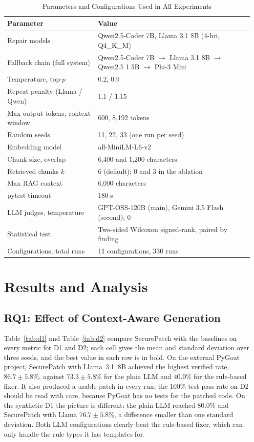 \documentclass[12pt,onecolumn,draftclsnofoot]{IEEEtran}
\begin{document}
\begin{table}[!tb]
\centering
\caption{Parameters and Configurations Used in All Experiments}
\label{tab:params}
\small
\renewcommand{\arraystretch}{1.15}
\begin{tabular}{L{5.6cm} L{9.0cm}}
\toprule
\textbf{Parameter} & \textbf{Value} \\
\midrule
Repair models & Qwen2.5-Coder 7B, Llama 3.1 8B (4-bit, Q4\_K\_M) \\
Fallback chain (full system) & Qwen2.5-Coder 7B $\rightarrow$ Llama 3.1 8B $\rightarrow$ Qwen2.5 1.5B $\rightarrow$ Phi-3 Mini \\
Temperature, top-$p$ & 0.2, 0.9 \\
Repeat penalty (Llama / Qwen) & 1.1 / 1.15 \\
Max output tokens, context window & 600, 8,192 tokens \\
Random seeds & 11, 22, 33 (one run per seed) \\
Embedding model & all-MiniLM-L6-v2 \\
Chunk size, overlap & 6,400 and 1,200 characters \\
Retrieved chunks $k$ & 6 (default); 0 and 3 in the ablation \\
Max RAG context & 6,000 characters \\
pytest timeout & 180 s \\
LLM judges, temperature & GPT-OSS-120B (main), Gemini 3.5 Flash (second); 0 \\
Statistical test & Two-sided Wilcoxon signed-rank, paired by finding \\
Configurations, total runs & 11 configurations, 330 runs \\
\bottomrule
\end{tabular}
\end{table}

\section{Results and Analysis}

\subsection{RQ1: Effect of Context-Aware Generation}
Table~\ref{tab:d1} and Table~\ref{tab:d2} compare SecurePatch with the baselines on every metric for D1 and D2; each cell gives the mean and standard deviation over three seeds, and the best value in each row is in bold. On the external PyGoat project, SecurePatch with Llama~3.1~8B achieved the highest verified rate, $86.7 \pm 5.8\%$, against $73.3 \pm 5.8\%$ for the plain LLM and $40.0\%$ for the rule-based fixer. It also produced a usable patch in every run; the 100\% test pass rate on D2 should be read with care, because PyGoat has no tests for the patched code. On the synthetic D1 the picture is different: the plain LLM reached $80.0\%$ and SecurePatch with Llama $76.7 \pm 5.8\%$, a difference smaller than one standard deviation. Both LLM configurations clearly beat the rule-based fixer, which can only handle the rule types it has templates for.
\end{document}
